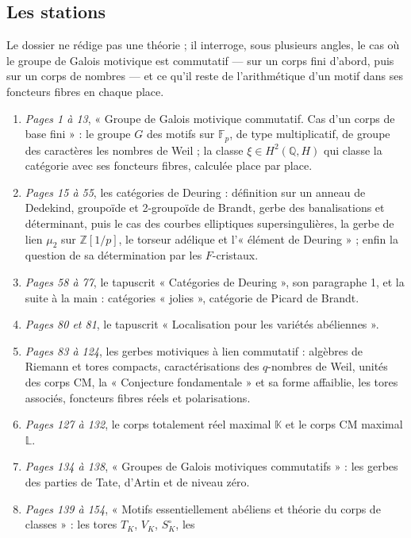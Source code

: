 \documentclass[11pt,a4paper]{article}
\begin{document}
\subsection*{Les stations}

Le dossier ne rédige pas une théorie ; il interroge, sous plusieurs angles, le
cas où le groupe de Galois motivique est commutatif --- sur un corps fini
d'abord, puis sur un corps de nombres --- et ce qu'il reste de l'arithmétique
d'un motif dans ses foncteurs fibres en chaque place.

\begin{enumerate}
  \item \emph{Pages 1 à 13}, « Groupe de Galois motivique commutatif. Cas
  d'un corps de base fini » : le groupe $G$ des motifs sur $\mathbb{F}_{p}$,
  de type multiplicatif, de groupe des caractères les nombres de Weil ; la
  classe $\xi \in H^{2}(\mathbb{Q}, H)$ qui classe la catégorie avec ses
  foncteurs fibres, calculée place par place.
  \item \emph{Pages 15 à 55}, les catégories de Deuring : définition sur un
  anneau de Dedekind, groupoïde et 2-groupoïde de Brandt, gerbe des
  banalisations et déterminant, puis le cas des courbes elliptiques
  supersingulières, la gerbe de lien $\mu_{2}$ sur $\mathbb{Z}[1/p]$, le
  torseur adélique et l'« élément de Deuring » ; enfin la question de sa
  détermination par les $F$-cristaux.
  \item \emph{Pages 58 à 77}, le tapuscrit « Catégories de Deuring », son
  paragraphe 1, et la suite à la main : catégories « jolies », catégorie de
  Picard de Brandt.
  \item \emph{Pages 80 et 81}, le tapuscrit « Localisation pour les variétés
  abéliennes ».
  \item \emph{Pages 83 à 124}, les gerbes motiviques à lien commutatif :
  algèbres de Riemann et tores compacts, caractérisations des $q$-nombres de
  Weil, unités des corps CM, la « Conjecture fondamentale » et sa forme
  affaiblie, les tores associés, foncteurs fibres réels et polarisations.
  \item \emph{Pages 127 à 132}, le corps totalement réel maximal
  $\mathbb{K}$ et le corps CM maximal $\mathbb{L}$.
  \item \emph{Pages 134 à 138}, « Groupes de Galois motiviques commutatifs » :
  les gerbes des parties de Tate, d'Artin et de niveau zéro.
  \item \emph{Pages 139 à 154}, « Motifs essentiellement abéliens et théorie
  du corps de classes » : les tores $T_{K}$, $V_{K}$, $S^{\circ}_{K}$, les

\end{enumerate}
\end{document}
